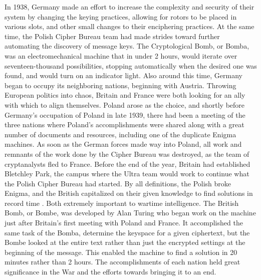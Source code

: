 In 1938, Germany made an effort to increase the complexity and security of their system by changing the keying practices, allowing for rotors to be placed in various slots, and other small changes to their enciphering practices. At the same time, the Polish Cipher Bureau team had made strides toward further automating the discovery of message keys. The Cryptological Bomb, or Bomba, was an electromechanical machine that in under 2 hours, would iterate over seventeen-thousand possibilities, stopping automatically when the desired one was found, and would turn on an indicator light. Also around this time, Germany began to occupy its neighboring nations, beginning with Austria. Throwing European politics into chaos, Britain and France were both looking for an ally with which to align themselves. Poland arose as the choice, and shortly before Germany’s occupation of Poland in late 1939, there had been a meeting of the three nations where Poland’s accomplishments were shared along with a great number of documents and resources, including one of the duplicate Enigma machines. As soon as the German forces made way into Poland, all work and remnants of the work done by the Cipher Bureau was destroyed, as the team of cryptanalysts fled to France. Before the end of the year, Britain had established Bletchley Park, the campus where the Ultra team would work to continue what the Polish Cipher Bureau had started. By all definitions, the Polish broke Enigma, and the British capitalized on their given knowledge to find solutions in record time \cite{rfc01}. Both extremely important to wartime intelligence. The British Bomb, or Bombe, was developed by Alan Turing who began work on the machine just after Britain’s first meeting with Poland and France. It accomplished the same task of the Bomba, determine the keyspace for a given ciphertext, but the Bombe looked at the entire text rather than just the encrypted settings at the beginning of the message. This enabled the machine to find a solution in 20 minutes rather than 2 hours. The accomplishments of each nation held great significance in the War and the efforts towards bringing it to an end.